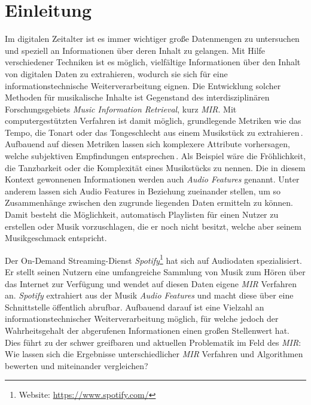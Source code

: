 \section*{Einleitung}
\label{sec:Einleitung}

Im digitalen Zeitalter ist es immer wichtiger große Datenmengen zu untersuchen und speziell an Informationen über deren Inhalt zu gelangen.
Mit Hilfe verschiedener Techniken ist es möglich, vielfältige Informationen über den Inhalt von digitalen Daten zu extrahieren, wodurch sie sich für eine informationstechnische Weiterverarbeitung eignen.
Die Entwicklung solcher Methoden für musikalische Inhalte ist Gegenstand des interdisziplinären Forschungsgebiets \textit{Music Information Retrieval}, kurz \textit{MIR}.
Mit computergestützten Verfahren ist damit möglich, grundlegende Metriken wie das Tempo, die Tonart oder das Tongeschlecht aus einem Musikstück zu extrahieren\,\cite{Casey2008}.
Aufbauend auf diesen Metriken lassen sich komplexere Attribute vorhersagen, welche subjektiven Empfindungen entsprechen\,\cite{Sturm2013}.
Als Beispiel wäre die Fröhlichkeit, die Tanzbarkeit oder die Komplexität eines Musikstücks zu nennen.
Die in diesem Kontext gewonnenen Informationen werden auch \textit{Audio Features} genannt.
Unter anderem lassen sich Audio Features in Beziehung zueinander stellen, um so Zusammenhänge zwischen den zugrunde liegenden Daten ermitteln zu können.
Damit besteht die Möglichkeit, automatisch Playlisten für einen Nutzer zu erstellen oder Musik vorzuschlagen, die er noch nicht besitzt, welche aber seinem Musikgeschmack entspricht.

Der On-Demand Streaming-Dienst \textit{Spotify}\footnote{Website: \url{https://www.spotify.com/}} hat sich auf Audiodaten spezialisiert.
Er stellt seinen Nutzern eine umfangreiche Sammlung von Musik zum Hören über das Internet zur Verfügung und wendet auf diesen Daten eigene \textit{MIR} Verfahren an.
\textit{Spotify} extrahiert aus der Musik \textit{Audio Features} und macht diese über eine Schnittstelle öffentlich abrufbar.
Aufbauend darauf ist eine Vielzahl an informationstechnischer Weiterverarbeitung möglich, für welche jedoch der Wahrheitsgehalt der abgerufenen Informationen einen großen Stellenwert hat.
Dies führt zu der schwer greifbaren und aktuellen Problematik im Feld des \textit{MIR}:
Wie lassen sich die Ergebnisse unterschiedlicher \textit{MIR} Verfahren und Algorithmen bewerten und miteinander vergleichen? \cite{Downie2004}

